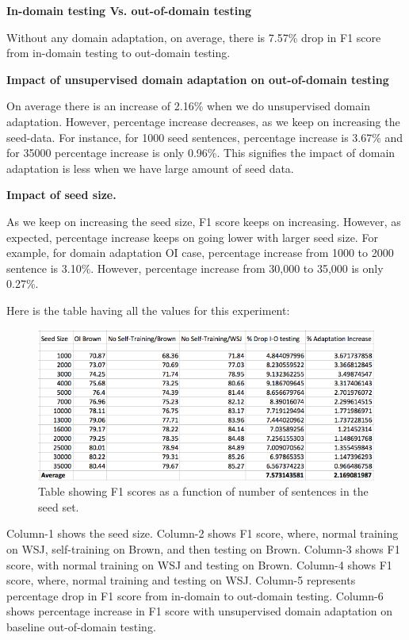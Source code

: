 \textbf {In-domain testing Vs. out-of-domain testing}

Without any domain adaptation, on average, there is 7.57\% drop in F1 score from in-domain testing to out-domain testing.

\textbf {Impact of unsupervised domain adaptation on out-of-domain testing}

On average there is an increase of 2.16\% when we do unsupervised domain adaptation. However, percentage increase decreases, as we keep on increasing the seed-data. For instance, for 1000 seed sentences, percentage increase is 3.67\% and for 35000 percentage increase is only 0.96\%. This signifies the impact of domain adaptation is less when we have large amount of seed data.

\textbf {Impact of seed size.}

As we keep on increasing the seed size, F1 score keeps on increasing. However, as expected, percentage increase keeps on going lower with larger seed size. For example, for domain adaptation OI case, percentage increase from 1000 to 2000 sentence is 3.10\%. However, percentage increase from 30,000 to 35,000 is only 0.27\%. 

Here is the table having all the values for this experiment:

\begin{figure}[ht!]
\centering
\includegraphics[width=140mm]{exp1-snapshot.png}
\caption{Table showing F1 scores as a function of number of sentences in the seed set. }
\label{accuracy}
\end{figure}

Column-1 shows the seed size. Column-2 shows F1 score, where, normal training on WSJ, self-training on Brown, and then testing on Brown. Column-3 shows F1 score, with normal training on WSJ and testing on Brown. Column-4 shows F1 score, where, normal training and testing on WSJ. Column-5 represents percentage drop in F1 score from in-domain to out-domain testing. Column-6 shows percentage increase in F1 score with unsupervised domain adaptation on baseline out-of-domain testing.

